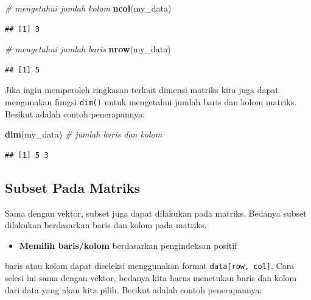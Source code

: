 \documentclass[
]{book}
\newenvironment{Shaded}{\begin{snugshade}}{\end{snugshade}}
\newcommand{\CommentTok}[1]{\textcolor[rgb]{0.56,0.35,0.01}{\textit{#1}}}
\newcommand{\FunctionTok}[1]{\textcolor[rgb]{0.13,0.29,0.53}{\textbf{#1}}}
\newcommand{\NormalTok}[1]{#1}
\providecommand{\tightlist}{%
  \setlength{\itemsep}{0pt}\setlength{\parskip}{0pt}}
\theoremstyle{definition}
\theoremstyle{definition}
\theoremstyle{definition}
\theoremstyle{definition}
\theoremstyle{remark}
\begin{document}
\begin{Shaded}
\begin{Highlighting}[]
\CommentTok{\# mengetahui jumlah kolom}
\FunctionTok{ncol}\NormalTok{(my\_data)}
\end{Highlighting}
\end{Shaded}

\begin{verbatim}
## [1] 3
\end{verbatim}

\begin{Shaded}
\begin{Highlighting}[]
\CommentTok{\# mengetahui jumlah baris}
\FunctionTok{nrow}\NormalTok{(my\_data)}
\end{Highlighting}
\end{Shaded}

\begin{verbatim}
## [1] 5
\end{verbatim}

Jika ingin memperoleh ringkasan terkait dimensi matriks kita juga dapat mengunakan fungsi \texttt{dim()} untuk mengetahui jumlah baris dan kolom matriks. Berikut adalah contoh penerapannya:

\begin{Shaded}
\begin{Highlighting}[]
\FunctionTok{dim}\NormalTok{(my\_data) }\CommentTok{\# jumlah baris dan kolom}
\end{Highlighting}
\end{Shaded}

\begin{verbatim}
## [1] 5 3
\end{verbatim}

\hypertarget{subsetmatrix}{%
\subsection{Subset Pada Matriks}\label{subsetmatrix}}

Sama dengan vektor, subset juga dapat dilakukan pada matriks. Bedanya subset dilakukan berdasarkan baris dan kolom pada matriks.

\begin{itemize}
\tightlist
\item
  \textbf{Memilih baris/kolom} berdasarkan pengindeksan positif
\end{itemize}

baris atau kolom dapat diseleksi menggunakan format \texttt{data{[}row,\ col{]}}. Cara selesi ini sama dengan vektor, bedanya kita harus menetukan baris dan kolom dari data yang akan kita pilih. Berikut adalah contoh penerapannya:
\end{document}
